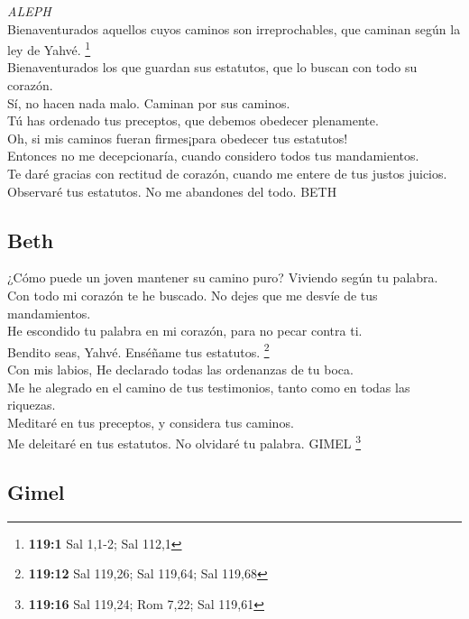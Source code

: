 \emph{ALEPH}\\
 Bienaventurados aquellos cuyos caminos son
irreprochables, que caminan según la ley de Yahvé. \footnote{\textbf{119:1}
  Sal 1,1-2; Sal 112,1}\\
 Bienaventurados los que guardan sus estatutos, que lo
buscan con todo su corazón.\\
 Sí, no hacen nada malo. Caminan por sus caminos.\\
 Tú has ordenado tus preceptos, que debemos obedecer
plenamente.\\
 Oh, si mis caminos fueran firmes¡para obedecer tus
estatutos!\\
 Entonces no me decepcionaría, cuando considero todos tus
mandamientos.\\
 Te daré gracias con rectitud de corazón, cuando me entere
de tus justos juicios.\\
 Observaré tus estatutos. No me abandones del todo. BETH

\hypertarget{beth}{%
\subsection{Beth}\label{beth}}

 ¿Cómo puede un joven mantener su camino puro? Viviendo
según tu palabra.\\
 Con todo mi corazón te he buscado. No dejes que me
desvíe de tus mandamientos.\\
 He escondido tu palabra en mi corazón, para no pecar
contra ti.\\
 Bendito seas, Yahvé. Enséñame tus estatutos.
\footnote{\textbf{119:12} Sal 119,26; Sal 119,64; Sal 119,68}\\
 Con mis labios, He declarado todas las ordenanzas de tu
boca.\\
 Me he alegrado en el camino de tus testimonios, tanto
como en todas las riquezas.\\
 Meditaré en tus preceptos, y considera tus caminos.\\
 Me deleitaré en tus estatutos. No olvidaré tu palabra.
GIMEL \footnote{\textbf{119:16} Sal 119,24; Rom 7,22; Sal 119,61}

\hypertarget{gimel}{%
\subsection{Gimel}\label{gimel}}

